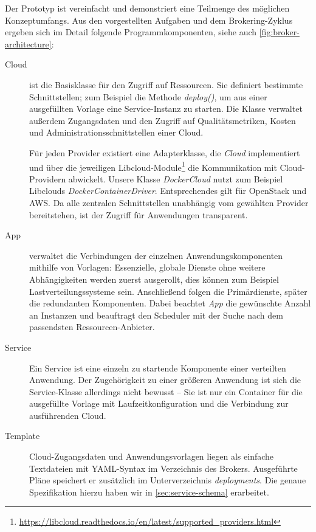 \noindent
Der Prototyp ist vereinfacht und demonstriert eine Teilmenge des möglichen Konzeptumfangs. Aus den vorgestellten Aufgaben und dem Brokering-Zyklus ergeben sich im Detail folgende Programmkomponenten, siehe auch  \autoref{fig:broker-architecture}:

\begin{description}
	
	\item[Cloud] ist die Basisklasse für den Zugriff auf Ressourcen. Sie definiert bestimmte Schnittstellen; zum Beispiel die Methode \emph{deploy()}, um aus einer ausgefüllten Vorlage eine Service-Instanz zu starten. Die Klasse verwaltet außerdem Zugangsdaten und den Zugriff auf Qualitätsmetriken, Kosten und Administrationsschnittstellen einer Cloud.
	
	Für jeden Provider existiert eine Adapterklasse, die \emph{Cloud} implementiert und über die jeweiligen Libcloud-Module\footnote{\url{https://libcloud.readthedocs.io/en/latest/supported_providers.html}} die Kommunikation mit Cloud-Providern abwickelt. Unsere Klasse \emph{DockerCloud} nutzt zum Beispiel Libclouds \emph{DockerContainerDriver}. Entsprechendes gilt für OpenStack und AWS. Da alle zentralen Schnittstellen unabhängig vom gewählten Provider bereitstehen, ist der Zugriff für Anwendungen transparent.
	
	\item[App] verwaltet die Verbindungen der einzelnen Anwendungskomponenten mithilfe von Vorlagen: Essenzielle, globale Dienste ohne weitere Abhängigkeiten werden zuerst ausgerollt, dies können zum Beispiel Lastverteilungssysteme sein. Anschließend folgen die Primärdienste, später die redundanten Komponenten. Dabei beachtet \emph{App} die gewünschte Anzahl an Instanzen und beauftragt den Scheduler mit der Suche nach dem passendsten Ressourcen-Anbieter.
	
	\item[Service] Ein Service ist eine einzeln zu startende Komponente einer verteilten Anwendung. Der Zugehörigkeit zu einer größeren Anwendung ist sich die Service-Klasse allerdings nicht bewusst -- Sie ist nur ein Container für die ausgefüllte Vorlage mit Laufzeitkonfiguration und die Verbindung zur ausführenden Cloud.
	
	\item[Template] Cloud-Zugangsdaten und Anwendungsvorlagen liegen als einfache Textdateien mit YAML-Syntax im Verzeichnis des Brokers. Ausgeführte Pläne speichert er zusätzlich im Unterverzeichnis \emph{deployments}. Die genaue Spezifikation hierzu haben wir in \autoref{sec:service-schema} erarbeitet.
	

\end{description}
